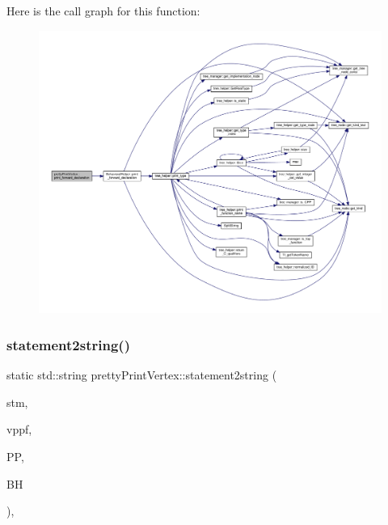 Here is the call graph for this function\+:
\nopagebreak
\begin{figure}[H]
\begin{center}
\leavevmode
\includegraphics[width=350pt]{d1/d0b/structprettyPrintVertex_a4cb8e4223c13af526a915070207d5c6b_cgraph}
\end{center}
\end{figure}
\mbox{\label{structprettyPrintVertex_aa3c36959163624dbfbf71316a5ac9512}} 
\subsubsection{\texorpdfstring{statement2string()}{statement2string()}}
{\footnotesize\ttfamily static std\+::string pretty\+Print\+Vertex\+::statement2string (\begin{DoxyParamCaption}\item[{unsigned int}]{stm,  }\item[{\hyperlink{structvar__pp__functor}{var\+\_\+pp\+\_\+functor} \&}]{vppf,  }\item[{\hyperlink{classsimple__indent}{simple\+\_\+indent} \&}]{PP,  }\item[{const \hyperlink{behavioral__helper_8hpp_aae973b54cac87eef3b27442aa3e1e425}{Behavioral\+Helper\+Const\+Ref}}]{BH }\end{DoxyParamCaption})\hspace{0.3cm}{\ttfamily [static]}, {\ttfamily [private]}}



